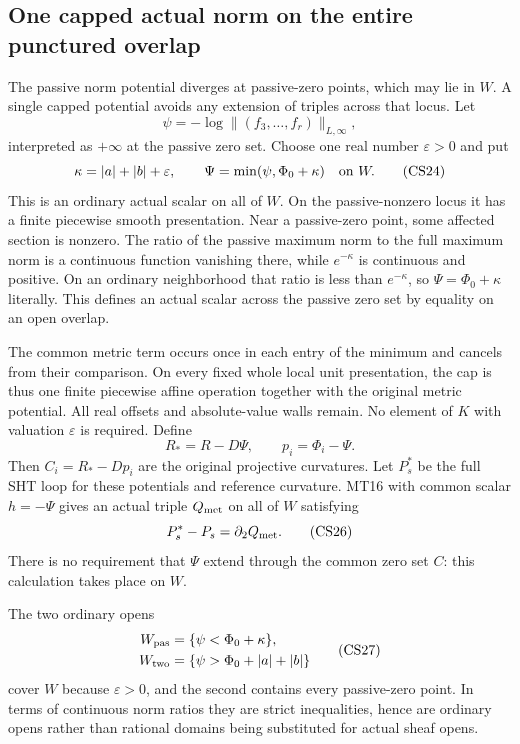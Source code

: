 \subsection{One capped actual norm on the entire punctured overlap}

The passive norm potential diverges at passive-zero points, which
may lie in $W$.  A single capped potential avoids any extension
of triples across that locus.  Let
\[
 \psi=-\log\|(f_3,\ldots,f_r)\|_{L,\infty},
 \tag{CS23}
\]
interpreted as $+\infty$ at the passive zero set.  Choose one real
number $\varepsilon>0$ and put
\[
 \kappa=|a|+|b|+\varepsilon,\qquad
                 \Psi=\min(\psi,\Phi_0+\kappa)\quad\hbox{on }W.
 \tag{CS24}
\]
This is an ordinary actual scalar on all of $W$.  On the
passive-nonzero locus it has a finite piecewise smooth presentation.
Near a passive-zero point, some affected section is nonzero.  The
ratio of the passive maximum norm to the full maximum norm is a
continuous function vanishing there, while $e^{-\kappa}$ is
continuous and positive.  On an ordinary neighborhood that ratio
is less than $e^{-\kappa}$, so $\Psi=\Phi_0+\kappa$ literally.
This defines an actual scalar across the passive zero set by
equality on an open overlap.

The common metric term occurs once in each entry of the minimum
and cancels from their comparison.  On every fixed whole local
unit presentation, the cap is thus one finite piecewise affine
operation together with the original metric potential.  All
real offsets and absolute-value walls remain.  No element of $K$
with valuation $\varepsilon$ is required.  Define
\[
                 R_*=R-D\Psi,\qquad p_i=\Phi_i-\Psi.
 \tag{CS25}
\]
Then $C_i=R_*-Dp_i$ are the original projective curvatures.
Let $P_s^*$ be the full SHT loop for these potentials and reference
curvature.  MT16 with common scalar $h=-\Psi$ gives an actual
triple $Q_{\rm met}$ on all of $W$ satisfying
\[
                   P_s^*-P_s=\partial_2Q_{\rm met}.
 \tag{CS26}
\]
There is no requirement that $\Psi$ extend through the common zero
set $C$: this calculation takes place on $W$.

The two ordinary opens
\[
 \begin{split}
 W_{\rm pas}&=\{\psi<\Phi_0+\kappa\},\\
 W_{\rm two}&=\{\psi>\Phi_0+|a|+|b|\}
 \end{split}
 \tag{CS27}
\]
cover $W$ because $\varepsilon>0$, and the second contains every
passive-zero point.  In terms of continuous norm ratios they are
strict inequalities, hence are ordinary opens rather than rational
domains being substituted for actual sheaf opens.

